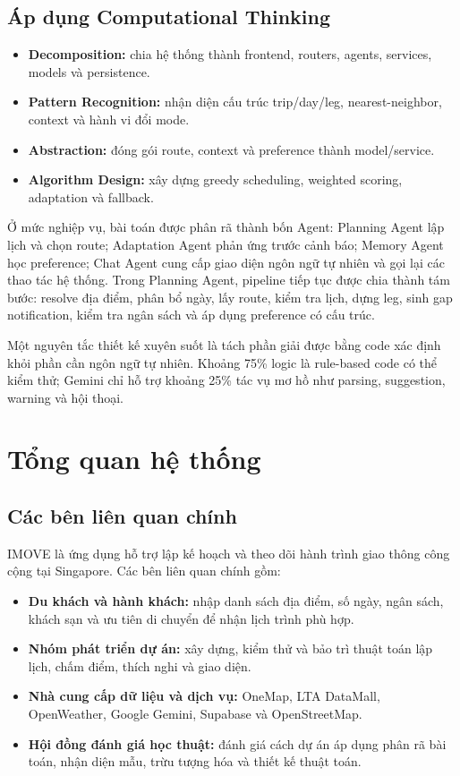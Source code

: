 \documentclass[12pt,a4paper]{article}
\begin{document}
\subsection{Áp dụng Computational Thinking}


\begin{itemize}
    \item \textbf{Decomposition:} chia hệ thống thành frontend, routers, agents, services, models và persistence.
    \item \textbf{Pattern Recognition:} nhận diện cấu trúc trip/day/leg, nearest-neighbor, context và hành vi đổi mode.
    \item \textbf{Abstraction:} đóng gói route, context và preference thành model/service.
    \item \textbf{Algorithm Design:} xây dựng greedy scheduling, weighted scoring, adaptation và fallback.
\end{itemize}

Ở mức nghiệp vụ, bài toán được phân rã thành bốn Agent: Planning Agent lập lịch và chọn route; Adaptation Agent phản ứng trước cảnh báo; Memory Agent học preference; Chat Agent cung cấp giao diện ngôn ngữ tự nhiên và gọi lại các thao tác hệ thống. Trong Planning Agent, pipeline tiếp tục được chia thành tám bước: resolve địa điểm, phân bổ ngày, lấy route, kiểm tra lịch, dựng leg, sinh gap notification, kiểm tra ngân sách và áp dụng preference có cấu trúc.

Một nguyên tắc thiết kế xuyên suốt là tách phần giải được bằng code xác định khỏi phần cần ngôn ngữ tự nhiên. Khoảng 75\% logic là rule-based code có thể kiểm thử; Gemini chỉ hỗ trợ khoảng 25\% tác vụ mơ hồ như parsing, suggestion, warning và hội thoại.

\section{Tổng quan hệ thống}

\subsection{Các bên liên quan chính}


IMOVE là ứng dụng hỗ trợ lập kế hoạch và theo dõi hành trình giao thông công cộng tại Singapore. Các bên liên quan chính gồm:

\begin{itemize}
    \item \textbf{Du khách và hành khách:} nhập danh sách địa điểm, số ngày, ngân sách, khách sạn và ưu tiên di chuyển để nhận lịch trình phù hợp.
    \item \textbf{Nhóm phát triển dự án:} xây dựng, kiểm thử và bảo trì thuật toán lập lịch, chấm điểm, thích nghi và giao diện.
    \item \textbf{Nhà cung cấp dữ liệu và dịch vụ:} OneMap, LTA DataMall, OpenWeather, Google Gemini, Supabase và OpenStreetMap.
    \item \textbf{Hội đồng đánh giá học thuật:} đánh giá cách dự án áp dụng phân rã bài toán, nhận diện mẫu, trừu tượng hóa và thiết kế thuật toán.
\end{itemize}
\end{document}
